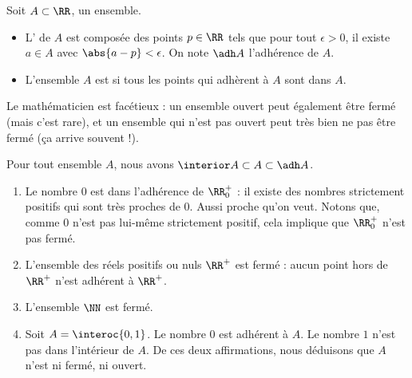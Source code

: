 \begin{frame}
  \begin{definition}
    Soit \(A \subset \RR\), un ensemble.
    \begin{itemize}
    \item L' de \(A\) est composée des points \(p \in \RR\) tels que pour tout \(\epsilon > 0\), il existe \(a \in A\) avec \(\abs{a-p} < \epsilon\). On note \(\adh A\) l'adhérence de \(A\).
    \item L'ensemble \(A\) est  si tous les points qui adhèrent à \(A\) sont dans \(A\).
    \end{itemize}
  \end{definition}
  \begin{remark}
    Le mathématicien est facétieux : un ensemble ouvert peut également être fermé (mais c'est rare), et un ensemble qui n'est pas ouvert peut très bien ne pas être fermé (ça arrive souvent !).
  \end{remark}
\end{frame}

\begin{frame}
  \begin{proposition}
    Pour tout ensemble \(A\), nous avons \(\interior A \subset A \subset \adh A\).
  \end{proposition}
\end{frame}

\begin{frame}
  \begin{example}
    \begin{enumerate}
    \item Le nombre \(0\) est dans l'adhérence de \(\RR_{0}^+\) : il existe des nombres strictement positifs qui sont très proches de \(0\). Aussi proche qu'on veut. Notons que, comme \(0\) n'est pas lui-même strictement positif, cela implique que \(\RR_0^+\) n'est pas fermé.
    \item L'ensemble des réels positifs ou nuls \(\RR^+\) est fermé : aucun point hors de \(\RR^+\) n'est adhérent à \(\RR^+\).
    \item L'ensemble \(\NN\) est fermé.
    \item Soit \(A = \interoc{0,1}\). Le nombre \(0\) est adhérent à \(A\). Le nombre \(1\) n'est pas dans l'intérieur de \(A\). De ces deux affirmations, nous déduisons que \(A\) n'est ni fermé, ni ouvert.
    \end{enumerate}
  \end{example}
\end{frame}

